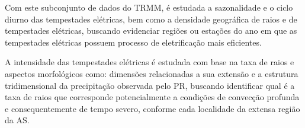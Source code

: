 Com este subconjunto de dados do TRMM, é estudada a sazonalidade e o ciclo diurno das tempestades elétricas, bem como a densidade geográfica de raios e de tempestades elétricas, buscando evidenciar regiões ou estações do ano em que as tempestades elétricas possuem processo de eletrificação mais eficientes.

A intensidade das tempestades elétricas é estudada com base na taxa de raios e aspectos morfológicos como: dimensões relacionadas a sua extensão e a estrutura tridimensional da precipitação observada pelo PR, buscando identificar qual é a taxa de raios que corresponde potencialmente a condições de convecção profunda e consequentemente de tempo severo, conforme cada localidade da extensa região da AS.














